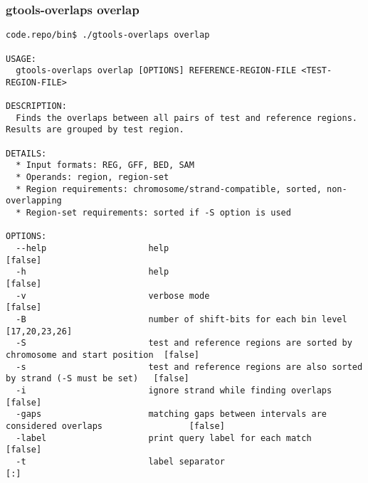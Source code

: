 \subsubsection{gtools-overlaps overlap}\label{gtools-overlaps_overlap}
\begin{lstlisting}
code.repo/bin$ ./gtools-overlaps overlap

USAGE:
  gtools-overlaps overlap [OPTIONS] REFERENCE-REGION-FILE <TEST-REGION-FILE>

DESCRIPTION:
  Finds the overlaps between all pairs of test and reference regions. Results are grouped by test region.

DETAILS:
  * Input formats: REG, GFF, BED, SAM
  * Operands: region, region-set
  * Region requirements: chromosome/strand-compatible, sorted, non-overlapping
  * Region-set requirements: sorted if -S option is used

OPTIONS:
  --help                    help                                                                    [false]
  -h                        help                                                                    [false]
  -v                        verbose mode                                                            [false]
  -B                        number of shift-bits for each bin level                                 [17,20,23,26]
  -S                        test and reference regions are sorted by chromosome and start position  [false]
  -s                        test and reference regions are also sorted by strand (-S must be set)   [false]
  -i                        ignore strand while finding overlaps                                    [false]
  -gaps                     matching gaps between intervals are considered overlaps                 [false]
  -label                    print query label for each match                                        [false]
  -t                        label separator                                                         [:]
\end{lstlisting}
%
